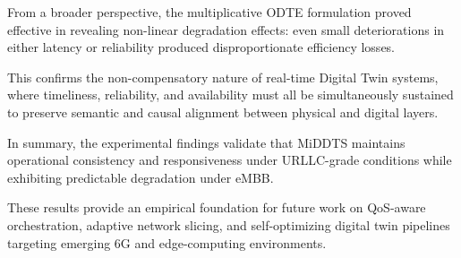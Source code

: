  From a broader perspective, the multiplicative ODTE formulation proved effective in revealing non-linear degradation effects: even small deteriorations in either latency or reliability produced disproportionate efficiency losses.

 This confirms the non-compensatory nature of real-time Digital Twin systems, where timeliness, reliability, and availability must all be simultaneously sustained to preserve semantic and causal alignment between physical and digital layers.

 In summary, the experimental findings validate that MiDDTS maintains operational consistency and responsiveness under URLLC-grade conditions while exhibiting predictable degradation under eMBB.

 These results provide an empirical foundation for future work on QoS-aware orchestration, adaptive network slicing, and self-optimizing digital twin pipelines targeting emerging 6G and edge-computing environments.
